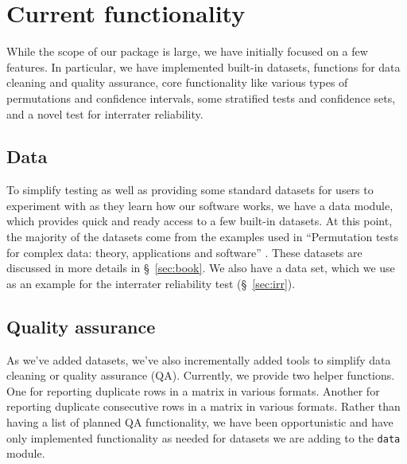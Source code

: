 \chapter{\label{ch:func}Current functionality}

While the scope of our package is large, we have initially focused on a few
features.  In particular, we have implemented built-in datasets, functions for
data cleaning and quality assurance, core functionality like various types of
permutations and confidence intervals, some stratified tests and confidence
sets, and a novel test for interrater reliability.

\section{Data}

To simplify testing as well as providing some standard datasets for
users to experiment with as they learn how our software works, we
have a data module, which provides quick and ready access to a few
built-in datasets. At this point, the majority of the datasets come
from the examples used in ``Permutation tests for complex data: theory,
applications and software'' \cite{pesarin2010permutation}.  These
datasets are discussed in more details in \S~\ref{sec:book}.  We also
have a data set, which we use as an example for the interrater
reliability test (\S~\ref{sec:irr}).

%

\section{Quality assurance}

As we've added datasets, we've also incrementally added tools to simplify data
cleaning or quality assurance (QA).  Currently, we provide two helper
functions.  One for reporting duplicate rows in a matrix in various formats.
Another for reporting duplicate consecutive rows in a matrix in various
formats.  Rather than having a list of planned QA functionality, we have been
opportunistic and have only implemented functionality as needed for datasets we
are adding to the \texttt{data} module.

